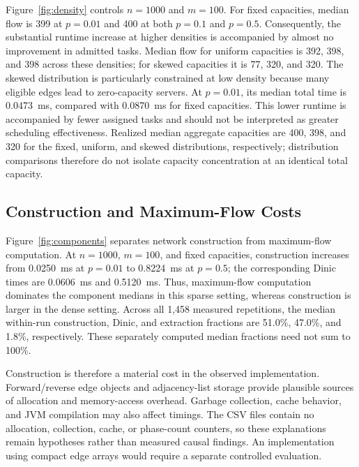 Figure~\ref{fig:density} controls $n=1000$ and $m=100$. For fixed capacities,
median flow is 399 at $p=0.01$ and 400 at both $p=0.1$ and $p=0.5$.
Consequently, the substantial runtime increase at higher densities is accompanied
by almost no improvement in admitted tasks. Median flow for uniform capacities
is 392, 398, and 398 across these densities; for skewed capacities it is
77, 320, and 320. The skewed distribution is particularly constrained at low
density because many eligible edges lead to zero-capacity servers. At $p=0.01$,
its median total time is 0.0473~ms, compared with 0.0870~ms for fixed capacities.
This lower runtime is accompanied by fewer assigned tasks and should not be
interpreted as greater scheduling effectiveness. Realized median aggregate
capacities are 400, 398, and 320 for the fixed, uniform, and skewed distributions,
respectively; distribution comparisons therefore do not isolate capacity
concentration at an identical total capacity.

\subsection{Construction and Maximum-Flow Costs}
Figure~\ref{fig:components} separates network construction from maximum-flow
computation. At $n=1000$, $m=100$, and fixed capacities, construction increases
from 0.0250~ms at $p=0.01$ to 0.8224~ms at $p=0.5$; the corresponding
Dinic times are 0.0606~ms and 0.5120~ms. Thus, maximum-flow computation
dominates the component medians in this sparse setting, whereas construction
is larger in the dense setting. Across all 1,458 measured repetitions, the
median within-run construction, Dinic, and extraction fractions are 51.0\%,
47.0\%, and 1.8\%, respectively. These separately computed median fractions
need not sum to 100\%.

Construction is therefore a material cost in the observed implementation.
Forward/reverse edge objects and adjacency-list storage provide plausible
sources of allocation and memory-access overhead. Garbage collection, cache
behavior, and JVM compilation may also affect timings. The CSV files contain
no allocation, collection, cache, or phase-count counters, so these explanations
remain hypotheses rather than measured causal findings. An implementation
using compact edge arrays would require a separate controlled evaluation.

